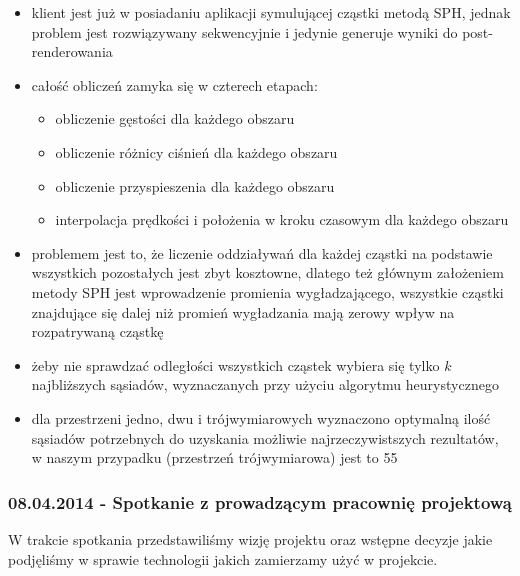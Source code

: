 \documentclass[polish, 12pt]{aghthesis}
\begin{document}
			\begin{itemize}
			
				\item klient jest już w posiadaniu aplikacji symulującej cząstki metodą SPH, jednak problem jest rozwiązywany sekwencyjnie i jedynie generuje wyniki do post-renderowania
				\item całość obliczeń zamyka się w czterech etapach:
				\begin{itemize}
				
					\item obliczenie gęstości dla każdego obszaru
					\item obliczenie różnicy ciśnień dla każdego obszaru
					\item obliczenie przyspieszenia dla każdego obszaru
					\item interpolacja prędkości i położenia w kroku czasowym dla każdego obszaru
				
				\end{itemize}
				\item problemem jest to, że liczenie oddziaływań dla każdej cząstki na podstawie wszystkich pozostałych jest zbyt kosztowne, dlatego też głównym założeniem metody SPH jest wprowadzenie promienia wygładzającego, wszystkie cząstki znajdujące się dalej niż promień wygładzania mają zerowy wpływ na rozpatrywaną cząstkę
				\item żeby nie sprawdzać odległości wszystkich cząstek wybiera się tylko $k$ najbliższych sąsiadów, wyznaczanych przy użyciu algorytmu heurystycznego
				\item dla przestrzeni jedno, dwu i trójwymiarowych wyznaczono optymalną ilość sąsiadów potrzebnych do uzyskania możliwie najrzeczywistszych rezultatów, w naszym przypadku (przestrzeń trójwymiarowa) jest to 55
			
			\end{itemize}
		
		\subsubsection*{08.04.2014 - Spotkanie z prowadzącym pracownię projektową}
		
			W trakcie spotkania przedstawiliśmy wizję projektu oraz wstępne decyzje jakie podjęliśmy w sprawie technologii jakich zamierzamy użyć w projekcie.
			
\end{document}
